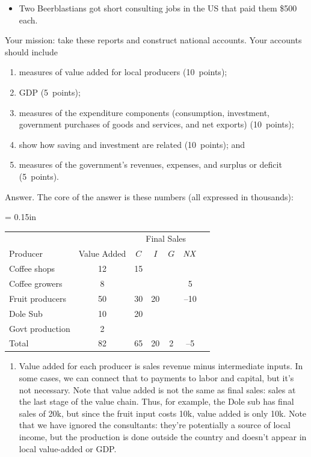 \documentclass[letterpaper,12pt]{article}
\newcommand{\NX}{\mbox{\it NX\/}}
\begin{document}
\begin{enumerate}
\begin{itemize}
\item Two Beerblastians got short
consulting jobs in the US that paid them \$500 each.
\end{itemize}
%
Your mission:  take these reports and construct national accounts.  
Your accounts should include 
\begin{enumerate}
\item measures of value added for local producers (10~points); 
\item GDP (5~points);
\item measures of the expenditure components (consumption,
investment, government purchases of goods and services, and net
exports) (10~points); 
\item show how saving and investment are related (10~points); 
and 
\item measures of the government's revenues, expenses, 
and surplus or deficit (5~points).  
\end{enumerate} 

Answer.  The core of the answer is these numbers 
(all expressed in thousands):  
%
\begin{center}
\tabcolsep = 0.15in
\begin{tabular}{lcccccc} 
\hline\hline%
       &&  \multicolumn{4}{c}{Final Sales} \\ 
\cline{3-6}
Producer   &  Value Added &  $C$ & $I$ & $G$ & $\NX$      \\
\hline\hline%
Coffee shops &  12  & 15  \\
Coffee growers & 8 & & & & 5 \\
Fruit producers & 50 & 30 & 20 & & --10 \\
Dole Sub  & 10 & 20  \\
Govt production & 2 \\
\hline 
Total & 82 & 65 & 20 & 2 & --5 \\
\hline\hline%
\end{tabular}
\end{center}

\begin{enumerate} 
\item Value added for each producer is sales revenue minus 
intermediate inputs.  
In some cases, we can connect that to payments to labor
and capital, but it's not necessary.  
Note that value added is not the same as final sales: 
sales at the last stage of the value chain.
Thus, for example, the Dole sub has final sales of 20k, 
but since the fruit input costs 10k, value added is only 10k.  
Note that we have ignored the consultants:  they're potentially 
a source of local income, but the production is done outside 
the country and doesn't appear in local value-added or GDP.  


\end{enumerate}
\end{enumerate}
\end{document}
